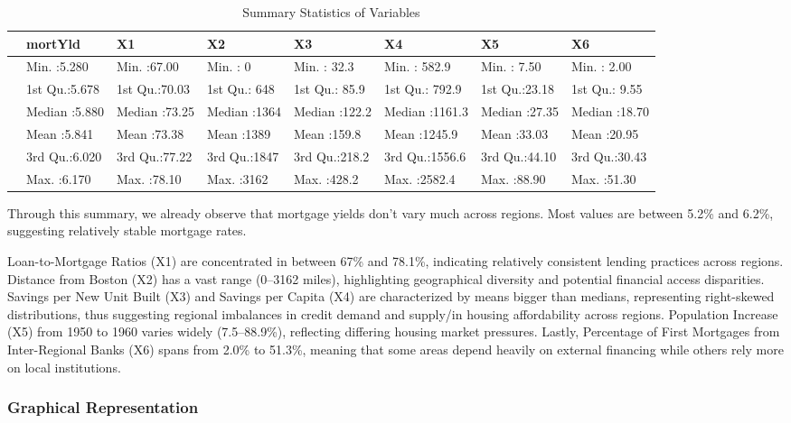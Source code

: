 \documentclass[
  11pt,
]{article}
\begin{document}
\begingroup\fontsize{8}{10}\selectfont

\begin{longtable}[t]{llllllll}
\caption{\label{tab:unnamed-chunk-3}Summary Statistics of Variables}\\
\toprule
 & mortYld & X1 & X2 & X3 & X4 & X5 & X6\\
\midrule
 & Min.   :5.280 & Min.   :67.00 & Min.   :   0 & Min.   : 32.3 & Min.   : 582.9 & Min.   : 7.50 & Min.   : 2.00\\
 & 1st Qu.:5.678 & 1st Qu.:70.03 & 1st Qu.: 648 & 1st Qu.: 85.9 & 1st Qu.: 792.9 & 1st Qu.:23.18 & 1st Qu.: 9.55\\
 & Median :5.880 & Median :73.25 & Median :1364 & Median :122.2 & Median :1161.3 & Median :27.35 & Median :18.70\\
 & Mean   :5.841 & Mean   :73.38 & Mean   :1389 & Mean   :159.8 & Mean   :1245.9 & Mean   :33.03 & Mean   :20.95\\
 & 3rd Qu.:6.020 & 3rd Qu.:77.22 & 3rd Qu.:1847 & 3rd Qu.:218.2 & 3rd Qu.:1556.6 & 3rd Qu.:44.10 & 3rd Qu.:30.43\\
\addlinespace
 & Max.   :6.170 & Max.   :78.10 & Max.   :3162 & Max.   :428.2 & Max.   :2582.4 & Max.   :88.90 & Max.   :51.30\\
\bottomrule
\end{longtable}
\endgroup{}

Through this summary, we already observe that mortgage yields don't vary
much across regions. Most values are between 5.2\% and 6.2\%, suggesting
relatively stable mortgage rates.

Loan-to-Mortgage Ratios (X1) are concentrated in between 67\% and
78.1\%, indicating relatively consistent lending practices across
regions. Distance from Boston (X2) has a vast range (0--3162 miles),
highlighting geographical diversity and potential financial access
disparities. Savings per New Unit Built (X3) and Savings per Capita (X4)
are characterized by means bigger than medians, representing
right-skewed distributions, thus suggesting regional imbalances in
credit demand and supply/in housing affordability across regions.
Population Increase (X5) from 1950 to 1960 varies widely (7.5--88.9\%),
reflecting differing housing market pressures. Lastly, Percentage of
First Mortgages from Inter-Regional Banks (X6) spans from 2.0\% to
51.3\%, meaning that some areas depend heavily on external financing
while others rely more on local institutions.

\subsubsection{Graphical Representation}\label{graphical-representation}
\end{document}
